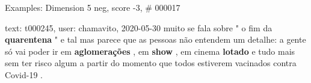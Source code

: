\begin{frame}{Examples: Dimension 5 neg, score -3, \# 000017}
\footnotesize
\begin{alertblock}{text: t000245, user: chamavito, 2020-05-30}
muito se fala sobre " o fim da \textbf{quarentena} " e tal mas parece que as 
pessoas não entendem um detalhe: a gente só vai poder ir em 
\textbf{aglomerações} , em \textbf{show} , em cinema \textbf{lotado} e tudo 
mais sem ter risco algum a partir do momento que todos estiverem vacinados 
contra Covid-19 . 
\end{alertblock}
\end{frame}
